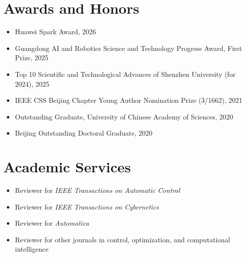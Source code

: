 \documentclass[11pt,a4paper]{article}
\begin{document}
\section{Awards and Honors}

\begin{itemize}
  \item Huawei Spark Award, 2026
  \item Guangdong AI and Robotics Science and Technology Progress Award, First Prize, 2025
  \item Top 10 Scientific and Technological Advances of Shenzhen University (for 2024), 2025
  \item IEEE CSS Beijing Chapter Young Author Nomination Prize (3/1662), 2021
  \item Outstanding Graduate, University of Chinese Academy of Sciences, 2020
  \item Beijing Outstanding Doctoral Graduate, 2020
\end{itemize}

\section{Academic Services}

\begin{itemize}
  \item Reviewer for \textit{IEEE Transactions on Automatic Control}
  \item Reviewer for \textit{IEEE Transactions on Cybernetics}
  \item Reviewer for \textit{Automatica}
  \item Reviewer for other journals in control, optimization, and computational intelligence
\end{itemize}
\end{document}
